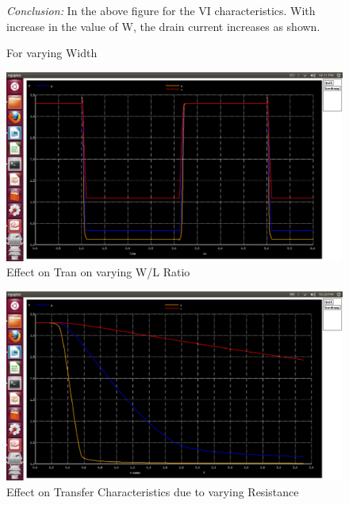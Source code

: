 \documentclass[12pt,a4paper]{article}
\begin{document}
\begin{center}
\begin{figure}[!ht]
\caption[Short]{For varying Width}
\textit{Conclusion:}  In the above figure for the VI characteristics. With increase in the value of W, the drain current increases as shown. 
\end{figure}


\begin{figure}[!ht]
\centering
\includegraphics[scale=0.37]{lab2_pic23_tran_effect_vary_wBYL.png}
\caption[Short]{Effect on Tran on varying W/L Ratio}
\end{figure}


\begin{figure}[!ht]
\centering
\includegraphics[scale=0.37]{lab2_pic24_effect_on_trans_char_Rvary.png}
\caption[Short]{Effect on Transfer Characteristics due to varying Resistance}
\end{figure}



\end{center}
\end{document}

